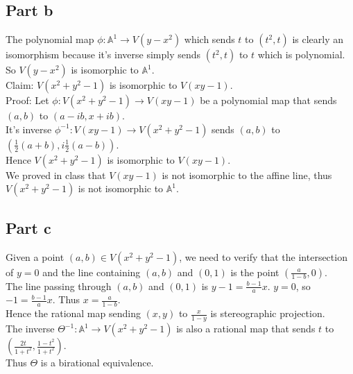 \documentclass[12pt]{article}
\begin{document}
\begin{enumerate}
\clearpage
\subsection*{Part b}
The polynomial map $\phi: \mathbb{A}^1 \rightarrow V(y-x^2)$
which sends $t$ to $(t^2,t)$ is clearly an isomorphism because it's inverse simply sends $(t^2,t)$ to $t$ which is polynomial. So $V(y-x^2)$ is isomorphic to $\mathbb{A}^1$. \\
Claim: $V(x^2+y^2-1)$ is isomorphic to $V(xy-1)$.
\\
Proof: Let $\phi:V(x^2+y^2-1) \rightarrow V(xy-1)$ be a polynomial map that sends $(a,b)$ to $(a-ib,x+ib)$.\\ 
It's inverse $\phi^{-1}: V(xy-1)
\rightarrow V(x^2+y^2-1)$ sends $(a,b)$ to
$(\frac{1}{2}(a+b),i\frac{1}{2}(a-b))$. \\
Hence $V(x^2+y^2-1)$ is isomorphic to $V(xy-1)$.
\\
We proved in class that $V(xy-1)$ is not isomorphic to the affine line, thus $V(x^2+y^2-1)$ is not isomorphic to $\mathbb{A}^1$.

\subsection*{Part c}
Given a point $(a,b) \in V(x^2+y^2-1)$, we need to verify that the intersection of $y=0$ and the line containing $(a,b)$ and $(0,1)$ is the point $(\frac{a}{1-b},0)$. \\
The line passing through  $(a,b)$ and $(0,1)$
is $y-1=\frac{b-1}{a}x$. $y=0$, so
$-1=\frac{b-1}{a}x$. Thus $x=\frac{a}{1-b}$. \\
Hence the rational map sending $(x,y)$ to
$\frac{x}{1-y}$ is stereographic projection. \\
The inverse $\Theta^{-1} : \mathbb{A}^1 \rightarrow V(x^2+y^2-1)$ is also a rational map
that sends $t$ to $(\frac{2t}{1+t^2},\frac{1-t^2}{1+t^2})$. \\
Thus $\Theta$ is a birational equivalence.


\end{enumerate}
\end{document}

